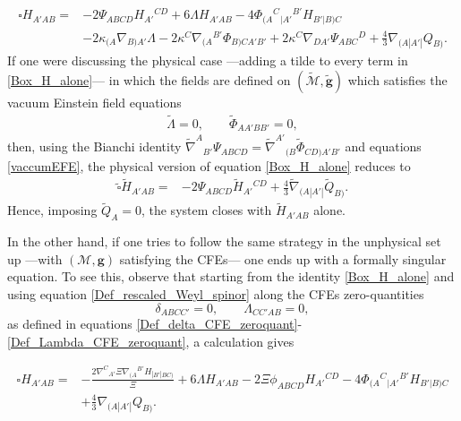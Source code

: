 \documentclass[10pt,a4paper]{article}
\theoremstyle{plain}
\def\bmg{{\bm g}}
\begin{document}
{\begin{align}\label{Box_H_alone}
\square H_{A'AB} = & -2 \Psi _{ABCD} H_{A'}{}^{CD} + 6 \Lambda
H_{A'AB} -4 \Phi _{(A}{}^{C}{}_{|A'}{}^{B'}H_{B'|B)C} \nonumber \\ &
-2 \kappa _{(A}\nabla_{B)A'}\Lambda -2
\kappa^{C}\nabla_{(A}{}^{B'}\Phi _{B)CA'B'} + 2 \kappa ^{C}
\nabla_{DA'}\Psi _{ABC}{}^{D} + \tfrac{4}{3} \nabla_{(A|A'|}Q_{B)}.
\end{align}
If one were discussing the physical case ---adding a tilde to every
term in \eqref{Box_H_alone}--- in which the fields are defined on
$(\tilde{\mathcal{M}},\tilde{\bmg})$ which satisfies the vacuum
Einstein field equations
\begin{align}\label{vaccumEFE}
  \tilde{\Lambda}=0, \qquad \tilde{\Phi}_{AA'BB'}=0,
\end{align}
then, using the Bianchi identity $\tilde{\nabla}^{A}{}_{B'}\Psi
_{ABCD}=\tilde{\nabla}^{A'}{}_{(B}\tilde{\Phi}_{CD)A'B'}$ and
equations \eqref{vaccumEFE},
the physical version of equation \eqref{Box_H_alone} reduces to
\begin{align}\label{Box_H_alone}
  \tilde{\square} \tilde{H}_{A'AB} = & -2 \Psi _{ABCD} \tilde{H}_{A'}{}^{CD}
  + \tfrac{4}{3} \tilde{\nabla}_{(A|A'|}\tilde{Q}_{B)}.
\end{align}
Hence, imposing $\tilde{Q}_A=0$, the system
closes with $\tilde{H}_{A'AB}$ alone.


\medskip

In the other hand, if one tries to follow the same strategy in the unphysical set up
---with $(\mathcal{M},\bmg)$ satisfying the CFEs--- one ends up with a
formally singular equation. To see this, observe that starting from
the identity \eqref{Box_H_alone} and using equation \eqref{Def_rescaled_Weyl_spinor}
along the CFEs zero-quantities
\[ \delta_{ABCC'}=0, \qquad \Lambda_{CC'AB}=0,\]
as defined in equations \eqref{Def_delta_CFE_zeroquant}-\eqref{Def_Lambda_CFE_zeroquant},
a calculation gives

\begin{align}\label{WaveH_twistor_singular}
  \square H_{A'AB} = & - \frac{2 \nabla^{C}{}_{A'}\Xi
    \nabla_{(A}{}^{B'}H_{|B'|BC)}}{\Xi } + 6 \Lambda H_{A'AB} -2 \Xi
  \phi _{ABCD}H_{A'}{}^{CD} -4
  \Phi_{(A}{}^{C}{}_{|A'}{}^{B'}H_{B'|B)C} \nonumber \\ & +
  \tfrac{4}{3} \nabla_{(A|A'|}Q_{B)}.
\end{align}

}
\end{document}
